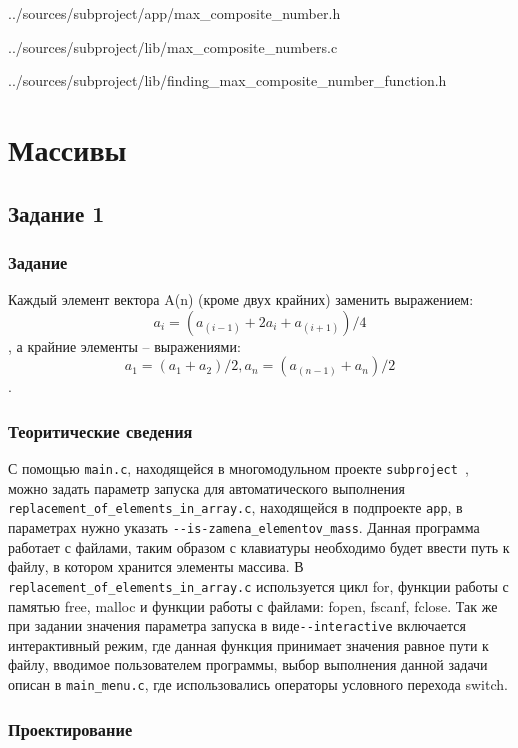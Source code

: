 \documentclass[12pt,a4paper]{report}
\begin{document}

{../sources/subproject/app/max_composite_number.h}


{../sources/subproject/lib/max_composite_numbers.c}


{../sources/subproject/lib/finding_max_composite_number_function.h}


\chapter{Массивы}
\section{Задание 1}
\subsection{Задание}
Каждый элемент вектора A(n) (кроме двух крайних) заменить выражением: \begin{equation}
a_i = (a_(i-1) + 2a_i + a_(i+1)) / 4
\end{equation}, а крайние элементы – выражениями: \begin{equation}a_1 = (a_1 + a_2)/2, a_n = (a_(n-1) + a_n)/2 \end{equation}.
\subsection{Теоритические сведения}
С помощью \verb+main.c+, находящейся в многомодульном проекте \verb+subproject +, можно задать параметр запуска для автоматического выполнения\\ 
\verb+replacement_of_elements_in_array.c+, находящейся в подпроекте \verb+app+, в параметрах нужно указать 
\verb+--is-zamena_elementov_mass+. Данная программа работает с файлами, таким образом с клавиатуры необходимо будет ввести путь к файлу, в котором хранится элементы массива. В \verb+replacement_of_elements_in_array.c+ используется цикл for, функции работы с памятью free, malloc и функции работы с файлами: fopen, fscanf, fclose. Так же при задании значения параметра запуска в виде\verb+--interactive+ включается интерактивный режим, где данная функция принимает значения равное пути к файлу, вводимое пользователем программы, выбор выполнения данной задачи описан в \verb+main_menu.c+, где использовались операторы условного перехода switch.

\subsection{Проектирование}
\end{document}
